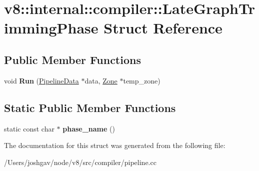 \hypertarget{structv8_1_1internal_1_1compiler_1_1_late_graph_trimming_phase}{}\section{v8\+:\+:internal\+:\+:compiler\+:\+:Late\+Graph\+Trimming\+Phase Struct Reference}
\label{structv8_1_1internal_1_1compiler_1_1_late_graph_trimming_phase}
\subsection*{Public Member Functions}
\begin{DoxyCompactItemize}
\item 
void {\bfseries Run} (\hyperlink{classv8_1_1internal_1_1compiler_1_1_pipeline_data}{Pipeline\+Data} $\ast$data, \hyperlink{classv8_1_1internal_1_1_zone}{Zone} $\ast$temp\+\_\+zone)\hypertarget{structv8_1_1internal_1_1compiler_1_1_late_graph_trimming_phase_abe3932edc48435c706e1ad6265b9667d}{}\label{structv8_1_1internal_1_1compiler_1_1_late_graph_trimming_phase_abe3932edc48435c706e1ad6265b9667d}

\end{DoxyCompactItemize}
\subsection*{Static Public Member Functions}
\begin{DoxyCompactItemize}
\item 
static const char $\ast$ {\bfseries phase\+\_\+name} ()\hypertarget{structv8_1_1internal_1_1compiler_1_1_late_graph_trimming_phase_acf945294496b5d8082219504828e9312}{}\label{structv8_1_1internal_1_1compiler_1_1_late_graph_trimming_phase_acf945294496b5d8082219504828e9312}

\end{DoxyCompactItemize}


The documentation for this struct was generated from the following file\+:\begin{DoxyCompactItemize}
\item 
/\+Users/joshgav/node/v8/src/compiler/pipeline.\+cc\end{DoxyCompactItemize}
